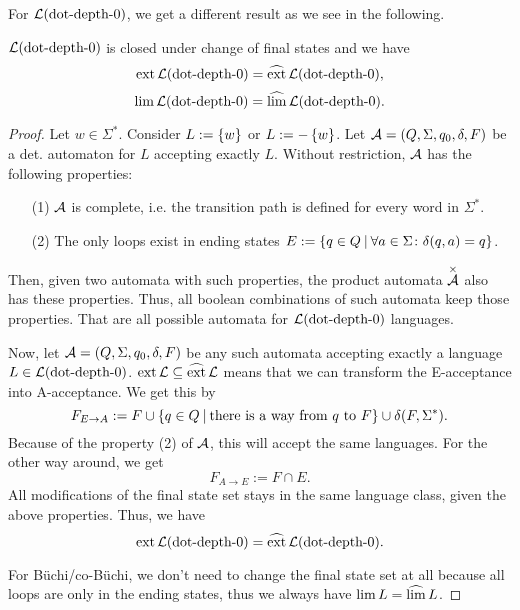 For $\mathcal{L}(\textup{\textrm{dot-depth-$0$}})$, we get a different result as we see in the following.
\begin{lemma}
\label{lang:dotdepth0:ext=dext-lim=dlim}
$\mathcal{L}(\textup{\textrm{dot-depth-$0$}})$ is closed under change of final states and we have
\[ \operatorname{ext} \mathcal{L}(\textup{\textrm{dot-depth-$0$}}) = \operatorname{\widehat{ext}} \mathcal{L}(\textup{\textrm{dot-depth-$0$}}), \]
\[ \lim \mathcal{L}(\textup{\textrm{dot-depth-$0$}}) = \operatorname{\widehat{lim}} \mathcal{L}(\textup{\textrm{dot-depth-$0$}}). \]
\begin{proof}
Let $w \in \Sigma^*$. Consider $L := \Set{w}$ or $L := -\Set{w}$. Let $\mathcal{A} = (Q,\Sigma,q_0,\delta,F)$ be a det. automaton for $L$ accepting exactly $L$. Without restriction, $\mathcal{A}$ has the following properties:
\begin{enumerate}
\item[(1)] $\mathcal{A}$ is complete, i.e. the transition path is defined for every word in $\Sigma^*$.
\item[(2)] The only loops exist in ending states $E := \Set{q \in Q}{\forall a \in \Sigma \colon \delta(q,a) = q}$.
\end{enumerate}
Then, given two automata with such properties, the product automata $\overset{\times}{\mathcal{A}}$ also has these properties. Thus, all boolean combinations of such automata keep those properties. That are all possible automata for $\mathcal{L}(\textup{\textrm{dot-depth-$0$}})$ languages.

Now, let $\mathcal{A} = (Q,\Sigma,q_0,\delta,F)$ be any such automata accepting exactly a language $L \in \mathcal{L}(\textup{\textrm{dot-depth-$0$}})$. $\operatorname{ext} \mathcal{L} \subseteq \operatorname{\widehat{ext}} \mathcal{L}$ means that we can transform the E-acceptance into A-acceptance. We get this by
\[ F_{E\rightarrow A} := F \cup \Set{q \in Q}{\text{there is a way from $q$ to $F$}} \cup \delta(F,\Sigma^*) . \]
Because of the property (2) of $\mathcal{A}$, this will accept the same languages. For the other way around, we get
\[ F_{A\rightarrow E} := F \cap E . \]
All modifications of the final state set stays in the same language class, given the above properties. Thus, we have
\[ \operatorname{ext} \mathcal{L}(\textup{\textrm{dot-depth-$0$}}) = \operatorname{\widehat{ext}} \mathcal{L}(\textup{\textrm{dot-depth-$0$}}) . \]

For Büchi/co-Büchi, we don't need to change the final state set at all because all loops are only in the ending states, thus we always have $\lim L = \operatorname{\widehat{lim}} L$.
\end{proof}
\end{lemma}

